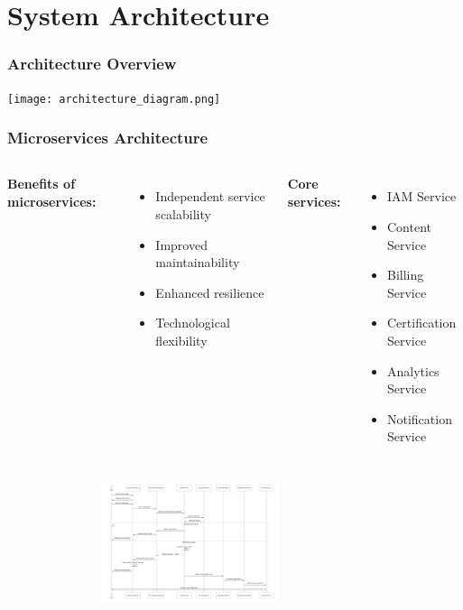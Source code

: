 \documentclass{beamer}
\begin{document}
\section{System Architecture}

\begin{frame}
\frametitle{Architecture Overview}
\begin{center}
    \texttt{[image: architecture\_diagram.png]}
\end{center}
\end{frame}

\begin{frame}
\frametitle{Microservices Architecture}
\begin{columns}
\textbf{Benefits of microservices:}
\begin{itemize}
    \item Independent service scalability
    \item Improved maintainability
    \item Enhanced resilience
    \item Technological flexibility
\end{itemize}

\textbf{Core services:}
\begin{itemize}
    \item IAM Service
    \item Content Service
    \item Billing Service
    \item Certification Service
    \item Analytics Service
    \item Notification Service
\end{itemize}
\end{columns}

\vspace{0.3cm}
\begin{center}
    \includegraphics[width=0.8\textwidth,height=3.5cm,keepaspectratio]{Editor _ Mermaid Chart-2025-06-06-214630.png}
\end{center}
\end{frame}
\end{document}
